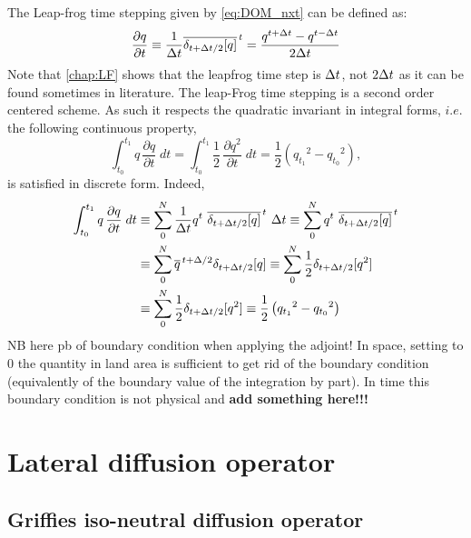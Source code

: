 \documentclass[../main/NEMO_manual]{subfiles}
\begin{document}
The Leap-frog time stepping given by \autoref{eq:DOM_nxt} can be defined as:
\[
  \frac{\partial q}{\partial t}
  \equiv \frac{1}{\Delta t} \overline{ \delta_{t+\Delta t/2}[q]}^{\,t}
  =         \frac{q^{t+\Delta t}-q^{t-\Delta t}}{2\Delta t}
\] 
Note that \autoref{chap:LF} shows that the leapfrog time step is $\Delta t$,
not $2\Delta t$ as it can be found sometimes in literature.
The leap-Frog time stepping is a second order centered scheme.
As such it respects the quadratic invariant in integral forms, $i.e.$ the following continuous property,
\[
  \int_{t_0}^{t_1} {q\, \frac{\partial q}{\partial t} \;dt}
  =\int_{t_0}^{t_1} {\frac{1}{2}\, \frac{\partial q^2}{\partial t} \;dt}
  =  \frac{1}{2} \left( {q_{t_1}}^2 - {q_{t_0}}^2 \right) ,
\]
is satisfied in discrete form.
Indeed, 
\[
  \begin{split}
    \int_{t_0}^{t_1} {q\, \frac{\partial q}{\partial t} \;dt}
    &\equiv \sum\limits_{0}^{N}
    {\frac{1}{\Delta t} q^t \ \overline{ \delta_{t+\Delta t/2}[q]}^{\,t} \ \Delta t}
    \equiv \sum\limits_{0}^{N}  { q^t \ \overline{ \delta_{t+\Delta t/2}[q]}^{\,t} } \\
    &\equiv \sum\limits_{0}^{N}  { \overline{q}^{\,t+\Delta/2}{ \delta_{t+\Delta t/2}[q]}}
    \equiv \sum\limits_{0}^{N}  { \frac{1}{2} \delta_{t+\Delta t/2}[q^2] }\\
    &\equiv \sum\limits_{0}^{N}  { \frac{1}{2} \delta_{t+\Delta t/2}[q^2] }
    \equiv \frac{1}{2} \left( {q_{t_1}}^2 - {q_{t_0}}^2 \right)
  \end{split}
\]
NB here pb of boundary condition when applying the adjoint!
In space, setting to 0 the quantity in land area is sufficient to get rid of the boundary condition 
(equivalently of the boundary value of the integration by part).
In time this boundary condition is not physical and \textbf{add something here!!!}


\section{Lateral diffusion operator}

\subsection{Griffies iso-neutral diffusion operator}
\end{document}
